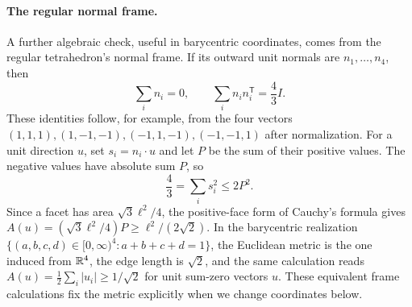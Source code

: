 \paragraph{The regular normal frame.}
A further algebraic check, useful in barycentric coordinates, comes
from the regular tetrahedron's normal frame.\label{par:normal-frame}
If its outward unit
normals are $n_1,\ldots,n_4$, then
\[
 \sum_i n_i=0,\qquad \sum_i n_i n_i^{\mathsf T}=\frac43 I.
\]
These identities follow, for example, from the four vectors
$(1,1,1),(1,-1,-1),(-1,1,-1),(-1,-1,1)$ after normalization.
For a unit direction $u$, set $s_i=n_i\cdot u$ and let $P$ be the
sum of their positive values. The negative values have absolute sum
$P$, so
\[
 \frac43=\sum_i s_i^2\le2P^2.
\]
Since a facet has area $\sqrt3\ell^2/4$, the positive-face form of
Cauchy's formula gives
$A(u)=(\sqrt3\ell^2/4)P\ge\ell^2/(2\sqrt2)$.
In the barycentric realization\label{par:barycentric-projection}
$\{(a,b,c,d)\in[0,\infty)^4:a+b+c+d=1\}$, the Euclidean
metric is the one induced from $\mathbb R^4$, the edge length is $\sqrt2$,
and the same calculation reads
$A(u)=\tfrac12\sum_i|u_i|\ge1/\sqrt2$ for unit sum-zero vectors $u$.
These equivalent frame calculations fix the metric explicitly when
we change coordinates below.
